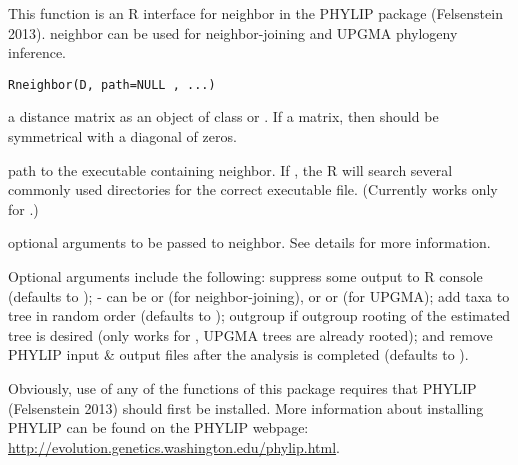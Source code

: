 \documentclass[a4paper]{book}
\begin{document}
%
\begin{Description}\relax
This function is an R interface for neighbor in the PHYLIP package (Felsenstein 2013). neighbor can be used for neighbor-joining and UPGMA phylogeny inference.
\end{Description}
%
\begin{Usage}
\begin{verbatim}
Rneighbor(D, path=NULL , ...)
\end{verbatim}
\end{Usage}
%
\begin{Arguments}
\begin{ldescription}
\item[\code{D}] a distance matrix as an object of class  or . If a matrix, then  should be symmetrical with a diagonal of zeros.
\item[\code{path}] path to the executable containing neighbor. If , the R will search several commonly used directories for the correct executable file. (Currently works only for .)
\item[\code{...}] optional arguments to be passed to neighbor. See details for more information.
\end{ldescription}
\end{Arguments}
%
\begin{Details}\relax
Optional arguments include the following:  suppress some output to R console (defaults to );  - can be  or  (for neighbor-joining), or  or  (for UPGMA);  add taxa to tree in random order (defaults to );  outgroup if outgroup rooting of the estimated tree is desired (only works for , UPGMA trees are already rooted); and  remove PHYLIP input \& output files after the analysis is completed (defaults to ).

Obviously, use of any of the functions of this package requires that PHYLIP (Felsenstein 2013) should first be installed. More information about installing PHYLIP can be found on the PHYLIP webpage: \url{http://evolution.genetics.washington.edu/phylip.html}.
\end{Details}
\end{document}
